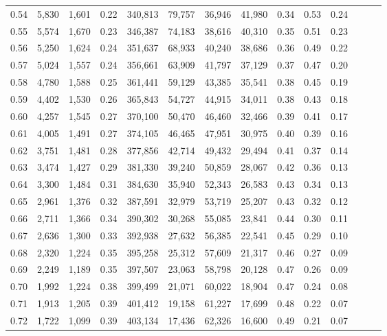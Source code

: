 \begin{tabular}{rrrrrrrrrrrrrr}
0.54 &  5,830 &  1,601 &  0.22 &  340,813 &   79,757 &  36,946 &  41,980 &  0.34 &  0.53 &      0.24 \\
0.55 &  5,574 &  1,670 &  0.23 &  346,387 &   74,183 &  38,616 &  40,310 &  0.35 &  0.51 &      0.23 \\
0.56 &  5,250 &  1,624 &  0.24 &  351,637 &   68,933 &  40,240 &  38,686 &  0.36 &  0.49 &      0.22 \\
0.57 &  5,024 &  1,557 &  0.24 &  356,661 &   63,909 &  41,797 &  37,129 &  0.37 &  0.47 &      0.20 \\
0.58 &  4,780 &  1,588 &  0.25 &  361,441 &   59,129 &  43,385 &  35,541 &  0.38 &  0.45 &      0.19 \\
0.59 &  4,402 &  1,530 &  0.26 &  365,843 &   54,727 &  44,915 &  34,011 &  0.38 &  0.43 &      0.18 \\
0.60 &  4,257 &  1,545 &  0.27 &  370,100 &   50,470 &  46,460 &  32,466 &  0.39 &  0.41 &      0.17 \\
0.61 &  4,005 &  1,491 &  0.27 &  374,105 &   46,465 &  47,951 &  30,975 &  0.40 &  0.39 &      0.16 \\
0.62 &  3,751 &  1,481 &  0.28 &  377,856 &   42,714 &  49,432 &  29,494 &  0.41 &  0.37 &      0.14 \\
0.63 &  3,474 &  1,427 &  0.29 &  381,330 &   39,240 &  50,859 &  28,067 &  0.42 &  0.36 &      0.13 \\
0.64 &  3,300 &  1,484 &  0.31 &  384,630 &   35,940 &  52,343 &  26,583 &  0.43 &  0.34 &      0.13 \\
0.65 &  2,961 &  1,376 &  0.32 &  387,591 &   32,979 &  53,719 &  25,207 &  0.43 &  0.32 &      0.12 \\
0.66 &  2,711 &  1,366 &  0.34 &  390,302 &   30,268 &  55,085 &  23,841 &  0.44 &  0.30 &      0.11 \\
0.67 &  2,636 &  1,300 &  0.33 &  392,938 &   27,632 &  56,385 &  22,541 &  0.45 &  0.29 &      0.10 \\
0.68 &  2,320 &  1,224 &  0.35 &  395,258 &   25,312 &  57,609 &  21,317 &  0.46 &  0.27 &      0.09 \\
0.69 &  2,249 &  1,189 &  0.35 &  397,507 &   23,063 &  58,798 &  20,128 &  0.47 &  0.26 &      0.09 \\
0.70 &  1,992 &  1,224 &  0.38 &  399,499 &   21,071 &  60,022 &  18,904 &  0.47 &  0.24 &      0.08 \\
0.71 &  1,913 &  1,205 &  0.39 &  401,412 &   19,158 &  61,227 &  17,699 &  0.48 &  0.22 &      0.07 \\
0.72 &  1,722 &  1,099 &  0.39 &  403,134 &   17,436 &  62,326 &  16,600 &  0.49 &  0.21 &      0.07 \\

\end{tabular}
